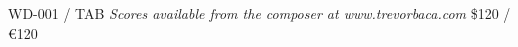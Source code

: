 \documentclass{article}
\begin{document}
\null \vfill

WD-001 / TAB \hfill
\textit{Scores available from the composer at www.trevorbaca.com}
\hfill \$120 / \euro 120
\end{document}
